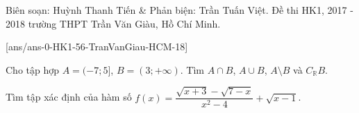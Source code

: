 \begin{name}
{Biên soạn: Huỳnh Thanh Tiến \& Phản biện: Trần Tuấn Việt.}
{Đề thi HK1, 2017 - 2018 trường THPT Trần Văn Giàu, Hồ Chí Minh.}
\end{name}
\setcounter{bt}{0}
[ans/ans-0-HK1-56-TranVanGiau-HCM-18]

\begin{bt}%
Cho tập hợp $ A=(-7;5] $, $ B=(3;+\infty) $.
Tìm $ A\cap B $, $ A\cup B $, $ A\setminus B $ và $ C_{\mathbb{R}}B $.
\loigiai{
$ A\cap B=(3;5] $, $ A\cup B=(-7;+\infty) $, $ A\setminus B=(-7;3] $ và $ C_{\mathbb{R}}B=(-\infty;3] $.
}
\end{bt}

\begin{bt}%
Tìm tập xác định của hàm số $ f(x)=\dfrac{\sqrt{x+3}-\sqrt{7-x}}{x^2-4}+\sqrt{x-1} $.
\end{bt}

